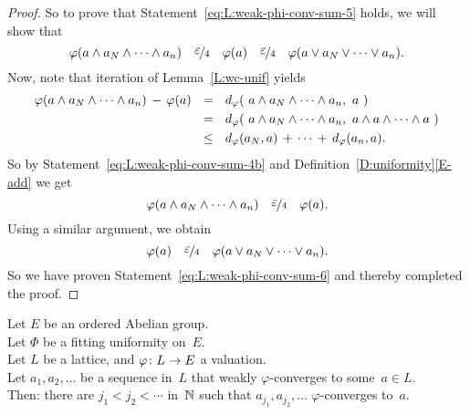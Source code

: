 \documentclass[main.tex]{subfiles}
\begin{document}
\begin{proof}
So to prove that Statement~\eqref{eq:L:weak-phi-conv-sum-5}
holds, we will show that
\begin{equation}
\label{eq:L:weak-phi-conv-sum-6}
\varphi(a\wedge a_N\wedge \dotsb \wedge a_n)
\quad\smash{\nicefrac{\textstyle{\varepsilon}}{4}}\quad\varphi(a)\quad\smash{\nicefrac{\textstyle{\varepsilon}}{4}}\quad
\varphi(a\vee a_N\vee \dotsb \vee a_n).
\end{equation}
Now, note that iteration of Lemma~\ref{L:wc-unif} yields
\begin{alignat*}{3}
\varphi(a\wedge a_N\wedge \dotsb \wedge a_n)
\,-\, \varphi(a)
\ \ &=\ \ 
\ld\varphi(\ a\wedge a_N\wedge\dotsb \wedge a_n,\ a\ )  \\
\ \ &=\ \ 
\ld\varphi(\ a\wedge a_N\wedge\dotsb \wedge a_n,
                      \ a\wedge a\wedge \dotsb \wedge a \  ) \\
\ \ &\leq\ \ 
\ld\varphi(a_N,a) \,+\,\dotsb \,+\,\ld\varphi(a_n,a).
\end{alignat*}
So by Statement~\eqref{eq:L:weak-phi-conv-sum-4b}
and Definition~\ref{D:uniformity}\ref{E-add} we get
\begin{equation*}
\varphi(a\wedge a_N\wedge \dotsb \wedge a_n)
\quad\smash{\nicefrac{\textstyle{\varepsilon}}{4}}\quad\varphi(a).
\end{equation*}
Using a similar argument,
we obtain 
\begin{equation*}
\varphi(a)\quad\smash{\nicefrac{\textstyle{\varepsilon}}{4}}\quad
\varphi(a\vee a_N\vee \dotsb \vee a_n).
\end{equation*}
So we have proven Statement~\eqref{eq:L:weak-phi-conv-sum-6} and 
thereby completed the proof.
\end{proof}
%
%
\begin{prop}
\label{P:weak-phi-conv-subseq}
Let $E$ be an ordered Abelian group.\\
Let $\Phi$ be a fitting uniformity on~$E$.\\
Let $L$ be a lattice, and $\varphi\colon L \rightarrow E$ a valuation.\\
Let $a_1,a_2,\dotsc$ be a sequence in~$L$
that weakly $\varphi$-converges to some~$a\in L$.\\
Then: there are $j_1<j_2<\dotsb$ in~$\mathbb{N}$
such that $a_{j_1},a_{j_2},\dotsc$
$\varphi$-converges to~$a$.
\end{prop}
\end{document}
